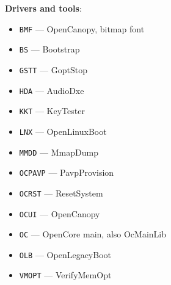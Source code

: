 \documentclass[]{article}
\providecommand{\tightlist}{%
  \setlength{\itemsep}{0pt}\setlength{\parskip}{0pt}}
\begin{document}
\begin{enumerate}
  \textbf{Drivers and tools}:
  \begin{itemize}
  \tightlist
  \item \texttt{BMF} --- OpenCanopy, bitmap font
  \item \texttt{BS} --- Bootstrap
  \item \texttt{GSTT} --- GoptStop
  \item \texttt{HDA} --- AudioDxe
  \item \texttt{KKT} --- KeyTester
  \item \texttt{LNX} --- OpenLinuxBoot
  \item \texttt{MMDD} --- MmapDump
  \item \texttt{OCPAVP} --- PavpProvision
  \item \texttt{OCRST} --- ResetSystem
  \item \texttt{OCUI} --- OpenCanopy
  \item \texttt{OC} --- OpenCore main, also OcMainLib
  \item \texttt{OLB} --- OpenLegacyBoot
  \item \texttt{VMOPT} --- VerifyMemOpt
  \end{itemize}


\end{enumerate}
\end{document}
